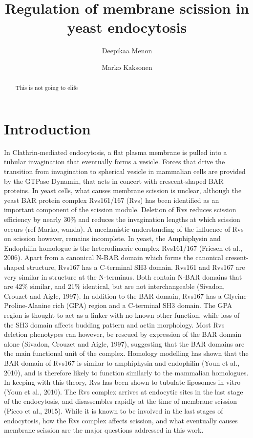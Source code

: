 \documentclass[9pt,lineno]{elife}
\title{Regulation of membrane scission in yeast endocytosis}
\author[1]{Deepikaa Menon}
\author[1*]{Marko Kaksonen}
\affil[1]{Department of Biochemistry, University of Geneva, Geneva, Switzerland}
\begin{document}
\maketitle

\begin{abstract}
This is not going to elife
\end{abstract}


\section{Introduction}

In Clathrin-mediated endocytosis, a flat plasma membrane is pulled into a tubular invagination that eventually forms a vesicle. Forces that drive the transition from invagination to spherical vesicle in mammalian cells are provided by the GTPase Dynamin, that acts in concert with crescent-shaped BAR proteins. In yeast cells, what causes membrane scission is unclear, although the yeast BAR protein complex Rvs161/167 (Rvs) has been identified as an important component of the scission module. Deletion of Rvs reduces scission efficiency by nearly 30\% and reduces the invagination lengths at which scission occurs (ref Marko, wanda). A mechanistic understanding of the influence of Rvs on scission however, remains incomplete. In yeast, the Amphiphysin and Endophilin homologue is the heterodimeric complex Rvs161/167 (Friesen et al., 2006). Apart from a canonical N-BAR domain which forms the canonical cresent-shaped structure, Rvs167 has a C-terminal SH3 domain. Rvs161 and Rvs167 are very similar in structure at the N-terminus. Both contain N-BAR domains that are 42\% similar, and 21\% identical, but are not interchangeable (Sivadon, Crouzet and Aigle, 1997). In addition to the BAR domain, Rvs167 has a Glycine-Proline-Alanine rich (GPA) region and a C-terminal SH3 domain. The GPA region is thought to act as a linker with no known other function, while loss of the SH3 domain affects budding pattern and actin morphology. Most Rvs deletion phenotypes can however, be rescued by expression of the BAR domain alone (Sivadon, Crouzet and Aigle, 1997), suggesting that the BAR domains are the main functional unit of the complex. Homology modelling has shown that the BAR domain of Rvs167 is similar to amphiphysin and endophilin (Youn et al., 2010), and is therefore likely to function similarly to the mammalian homologues. In keeping with this theory, Rvs has been shown to tubulate liposomes in vitro (Youn et al., 2010). The Rvs complex arrives at endocytic sites in the last stage of the endocytosis, and disassembles rapidly at the time of membrane scission (Picco et al., 2015). While it is known to be involved in the last stages of endocytosis, how the Rvs complex affects scission, and what eventually causes membrane scission are the major questions addressed in this work. 
\end{document}
